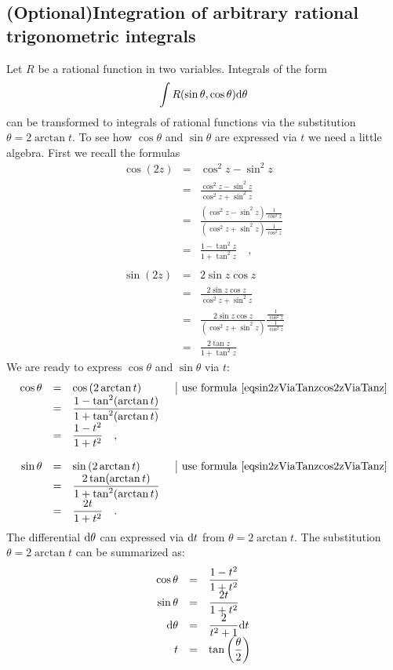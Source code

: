 \documentclass[12pt]{book}
\newcommand{\optionalMaterial}{\textbf{(Optional)}}
\begin{document}
\subsection{\optionalMaterial Integration of arbitrary rational trigonometric integrals}\label{secTrigIntegralsWith2Arctan}
Let $R$ be a rational function in two variables. Integrals of the form
\[
\int R(\sin \theta,\cos \theta ){\normalfont \text{d}} \theta
\]
can be transformed to integrals of rational functions via the substitution $\theta= 2\arctan t$. To see how $\cos \theta$ and $\sin \theta$ are expressed via $t$ we need a little algebra. First we recall the formulas
\begin{equation}\label{eqsin2zViaTanzcos2zViaTanz}
\begin{array}{rcll|l}
\cos (2z)&=& \displaystyle \cos^2 z- \sin^{2}z\\
&=&\displaystyle \frac{\cos^{2}z- \sin^{2}z }{ \cos^2z + \sin^2 z}\\
&=&\displaystyle \frac{\left(\cos^{2}z- \sin^{2 } z\right) \frac{1}{\cos^2 z}}{ \left( \cos^2z+\sin^2z \right) \frac{1}{ \cos^2 z}}\\
&=&\displaystyle \frac{1-\tan^2 z}{1+\tan^2z}\quad ,\\~\\
\sin(2z)&=& 2\sin z \cos z\\
&=&\displaystyle \frac{2\sin z \cos z}{\cos^2z+\sin^2z}\\
&=&\displaystyle \frac{2\sin z \cos z}{\left(\cos^2z+\sin^2z\right)} \frac{\frac{ 1}{\cos^2z}}{ \frac{ 1}{\cos^2z}}\\
&=&\displaystyle \frac{2\tan z}{1+\tan^2z}
\end{array}
\end{equation}
We are ready to express $\cos \theta$ and $\sin \theta$ via $t$:
\[
\begin{array}{rcll|l}
\cos \theta&=& \cos \left(2\arctan t\right)&&\text{use formula \eqref{eqsin2zViaTanzcos2zViaTanz}}\\
&=&\displaystyle \frac{1- \tan^2(\arctan t)}{ 1 + \tan^2( \arctan t)}\\
&=&\displaystyle  \frac{1- t^2}{1+t^2}\quad ,\\~\\
\sin \theta&=& \sin \left(2\arctan t\right)&&\text{use formula \eqref{eqsin2zViaTanzcos2zViaTanz}}\\
&=&\displaystyle \frac{2\tan(\arctan t)}{1+\tan^2(\arctan t)}\\
&=&\displaystyle  \frac{2t}{1+t^2}\quad .
\end{array}
\]
The differential ${\normalfont \text{d}} \theta$ can expressed via ${\normalfont \text{d}} t$ from $\theta=2\arctan t$. The substitution $\theta=2\arctan t$ can be summarized as:
\[
\begin{array}{rcl}
\cos \theta&=&\displaystyle  \frac{1- t^2}{1+t^2} \\
\sin \theta&=&\displaystyle \frac{2t}{1+t^2}\\
{\normalfont \text{d}} \theta&=&\displaystyle \frac{2}{t^2+1}{\normalfont \text{d}} t \\
t&=&\displaystyle \tan \left(\frac {\theta}{2}\right)
\end{array}
\]
\end{document}
